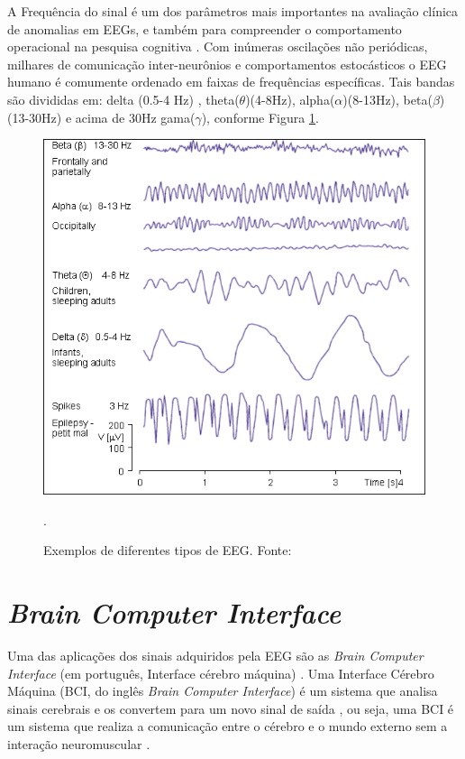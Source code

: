 A Frequência do sinal é um dos parâmetros mais importantes na avaliação clínica de anomalias em EEGs, e também para compreender o comportamento operacional na pesquisa cognitiva \cite{SIULYDissertacao}.
Com inúmeras oscilações não periódicas, milhares de comunicação inter-neurônios e comportamentos estocásticos o EEG humano é comumente ordenado  em faixas de frequências específicas. Tais bandas são divididas em: delta
 (0.5-4 Hz) , theta($\theta$)(4-8Hz), alpha($\alpha$)(8-13Hz), beta($\beta$)(13-30Hz) e acima de 30Hz gama($\gamma$), conforme Figura \ref{EEGcomun}.
 \newline

\begin{figure}[h]
	\centering
	\includegraphics[keepaspectratio=true,scale=0.75]{figuras/formas_EEG.png}
	\caption{Exemplos de diferentes tipos de EEG. Fonte: \cite{campisi2012eeg}}.
	\label{EEGcomun}
\end{figure}


\section{\textit{Brain Computer Interface}}

Uma das aplicações dos sinais adquiridos pela EEG são as \textit{Brain Computer Interface} (em português, Interface cérebro máquina) \cite{F.Lotte, SIULYDissertacao}. Uma Interface Cérebro Máquina (BCI, do inglês \textit{Brain Computer Interface}) é um sistema que analisa sinais cerebrais e os convertem para um novo sinal de saída \cite{BCIWolpaw}, ou seja, uma BCI é um sistema que realiza a comunicação entre o cérebro e o mundo externo sem a interação neuromuscular \cite{BCIWolpaw}.

